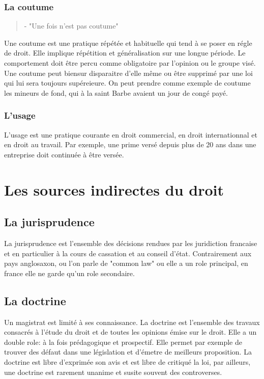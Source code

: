\documentclass[a4paper]{article}
\begin{document}
				\subsubsection{La coutume}
					\begin{quote}
						- "Une fois n'est pas coutume"
					\end{quote}
					Une coutume est une pratique répétée et habituelle qui tend à se poser en régle de droit. Elle implique répétition et généralisation sur une longue période. Le comportement doit être percu comme obligatoire par l'opinion ou le groupe visé. Une coutume peut biensur disparaitre d'elle même ou être supprimé par une loi qui lui sera toujours supéreieure. On peut prendre comme exemple de coutume les mineurs de fond, qui à la saint Barbe avaient un jour de congé payé. 
				\subsubsection{L'usage}
					L'usage est une pratique courante en droit commercial, en droit internationnal et en droit au travail. Par exemple, une prime versé depuis plus de 20 ans dans une entreprise doit continuée à être versée. 
		\section{Les sources indirectes du droit}
			\subsection{La jurisprudence}
				La jurisprudence est l'ensemble des décisions rendues par les juridiction francaise et en particulier à la cours de cassation et au conseil d'état. Contrairement aux pays anglosaxon, ou l'on parle de "common law" ou elle a un role principal, en france elle ne garde qu'un role secondaire. 
			\subsection{La doctrine}
				Un magistrat est limité à ses connaissance. La doctrine est l'ensemble des travaux consacrés à l'étude du droit et de toutes les opinions émise sur le droit. Elle a un double role: à la fois prédagogique et prospectif. Elle permet par exemple de trouver des défaut dans une législation et d'émetre de meilleurs proposition. La doctrine est libre d'exprimée son avis et est libre de critiqué la loi, par ailleurs, une doctrine est rarement unanime et susite souvent des controverses. 
				
\end{document}
